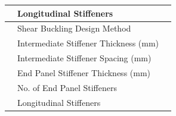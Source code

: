 \documentclass[12pt,a4paper]{report}
\numberwithin{table}{chapter}
\numberwithin{figure}{chapter}
\newcommand{\reportrowpad}{4pt}
\newcommand{\reportsectiongap}{0.75em}
\begin{document}
\begin{longtable}{|C{2.5cm}|L{6.5cm}|>{\arraybackslash}p{6.5cm}|}
 & \textnormal{Longitudinal Stiffeners} &  \\[\reportrowpad]
\hline
{} & \textnormal{Shear Buckling Design Method} &  \\[\reportrowpad]
 & \textnormal{Intermediate Stiffener Thickness (mm)} &  \\[\reportrowpad]
 & \textnormal{Intermediate Stiffener Spacing (mm)} &  \\[\reportrowpad]
 & \textnormal{End Panel Stiffener Thickness (mm)} &  \\[\reportrowpad]
 & \textnormal{No. of End Panel Stiffeners} &  \\[\reportrowpad]
 & \textnormal{Longitudinal Stiffeners} &  \\[\reportrowpad]
\hline
\end{longtable}

\vspace{\reportsectiongap}
\end{document}
